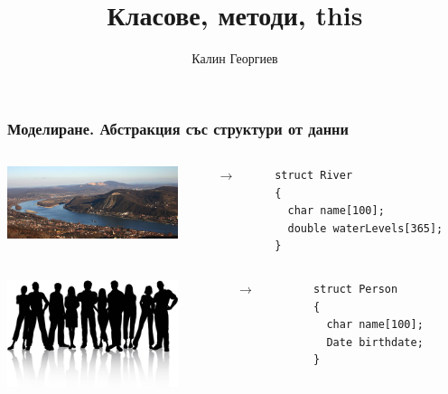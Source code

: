 \documentclass{beamer}
\begin{document}
\title[Обектно ориентирано програмиране]{Класове, методи, this} 
\author{Калин Георгиев} 
\frame{\titlepage} 


\begin{frame}[fragile]
\frametitle{Моделиране. Абстракция със структури от данни}


\begin{columns}[c]
  \begin{column}{0.4\textwidth}
  \includegraphics[width=5cm]{images/danube}
  \end{column}
  \begin{column}{0.1\textwidth}
  $\rightarrow$
  \end{column}
  \begin{column}{0.4\textwidth}
\begin{flushleft}
\begin{lstlisting}
struct River
{
  char name[100];
  double waterLevels[365];
}
\end{lstlisting}  
\end{flushleft}
  \end{column}
\end{columns}


\vspace{30px}

\begin{columns}[c]
  \begin{column}{0.4\textwidth}
  \includegraphics[width=5cm]{images/people}
  \end{column}
  \begin{column}{0.1\textwidth}
  $\rightarrow$
  \end{column}
  \begin{column}{0.4\textwidth}
\begin{flushleft}
\begin{lstlisting}
struct Person
{
  char name[100];
  Date birthdate;
}
\end{lstlisting}  
\end{flushleft}
  \end{column}
\end{columns}


\end{frame}
\end{document}
